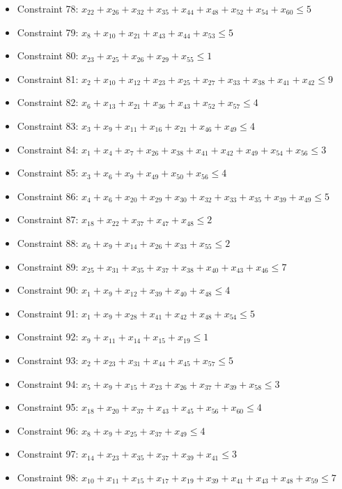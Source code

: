 \documentclass[11pt]{article}
\begin{document}
\begin{itemize}
\item Constraint 78: $x_{22} + x_{26} + x_{32} + x_{35} + x_{44} + x_{48} + x_{52} + x_{54} + x_{60} \le 5$
\item Constraint 79: $x_{8} + x_{10} + x_{21} + x_{43} + x_{44} + x_{53} \le 5$
\item Constraint 80: $x_{23} + x_{25} + x_{26} + x_{29} + x_{55} \le 1$
\item Constraint 81: $x_{2} + x_{10} + x_{12} + x_{23} + x_{25} + x_{27} + x_{33} + x_{38} + x_{41} + x_{42} \le 9$
\item Constraint 82: $x_{6} + x_{13} + x_{21} + x_{36} + x_{43} + x_{52} + x_{57} \le 4$
\item Constraint 83: $x_{3} + x_{9} + x_{11} + x_{16} + x_{21} + x_{46} + x_{49} \le 4$
\item Constraint 84: $x_{1} + x_{4} + x_{7} + x_{26} + x_{38} + x_{41} + x_{42} + x_{49} + x_{54} + x_{56} \le 3$
\item Constraint 85: $x_{3} + x_{6} + x_{9} + x_{49} + x_{50} + x_{56} \le 4$
\item Constraint 86: $x_{4} + x_{6} + x_{20} + x_{29} + x_{30} + x_{32} + x_{33} + x_{35} + x_{39} + x_{49} \le 5$
\item Constraint 87: $x_{18} + x_{22} + x_{37} + x_{47} + x_{48} \le 2$
\item Constraint 88: $x_{6} + x_{9} + x_{14} + x_{26} + x_{33} + x_{55} \le 2$
\item Constraint 89: $x_{25} + x_{31} + x_{35} + x_{37} + x_{38} + x_{40} + x_{43} + x_{46} \le 7$
\item Constraint 90: $x_{1} + x_{9} + x_{12} + x_{39} + x_{40} + x_{48} \le 4$
\item Constraint 91: $x_{1} + x_{9} + x_{28} + x_{41} + x_{42} + x_{48} + x_{54} \le 5$
\item Constraint 92: $x_{9} + x_{11} + x_{14} + x_{15} + x_{19} \le 1$
\item Constraint 93: $x_{2} + x_{23} + x_{31} + x_{44} + x_{45} + x_{57} \le 5$
\item Constraint 94: $x_{5} + x_{9} + x_{15} + x_{23} + x_{26} + x_{37} + x_{39} + x_{58} \le 3$
\item Constraint 95: $x_{18} + x_{20} + x_{37} + x_{43} + x_{45} + x_{56} + x_{60} \le 4$
\item Constraint 96: $x_{8} + x_{9} + x_{25} + x_{37} + x_{49} \le 4$
\item Constraint 97: $x_{14} + x_{23} + x_{35} + x_{37} + x_{39} + x_{41} \le 3$
\item Constraint 98: $x_{10} + x_{11} + x_{15} + x_{17} + x_{19} + x_{39} + x_{41} + x_{43} + x_{48} + x_{59} \le 7$

\end{itemize}
\end{document}
